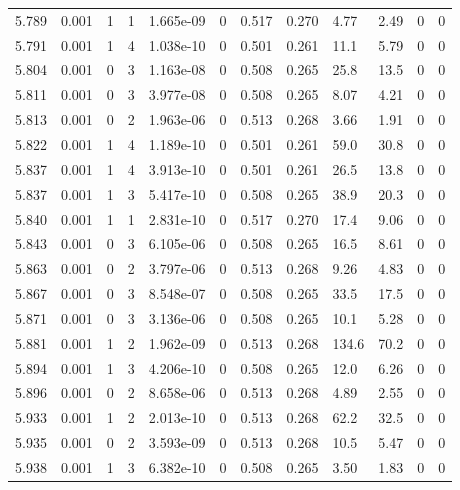 \documentclass[preview]{standalone}
\begin{document}
{{{{{{{{{{{{{{{{\begin{tabular}{L{1.2cm}C{1.2cm} C{0.3cm}C{0.5cm} C{1.4cm}C{1.4cm} C{1.4cm}C{1.4cm} C{1.6cm}C{1.6cm} C{1.6cm}C{1.6cm}}
  5.789  &  0.001  & 1     &  1 &  1.665e-09  & 0  &  0.517&   0.270& 4.77 & 2.49   &  0 & 0  \\ 
  5.791  &  0.001  & 1     &  4 &  1.038e-10  & 0  &  0.501&   0.261& 11.1 & 5.79   &  0 & 0  \\ 
  5.804  &  0.001  & 0     &  3 &  1.163e-08  & 0  &  0.508&   0.265& 25.8 & 13.5   &  0 & 0  \\ 
  5.811  &  0.001  & 0     &  3 &  3.977e-08  & 0  &  0.508&   0.265& 8.07 & 4.21   &  0 & 0  \\ 
  5.813  &  0.001  & 0     &  2 &  1.963e-06  & 0  &  0.513&   0.268& 3.66 & 1.91   &  0 & 0  \\ 
  5.822  &  0.001  & 1     &  4 &  1.189e-10  & 0  &  0.501&   0.261& 59.0 & 30.8   &  0 & 0  \\ 
  5.837  &  0.001  & 1     &  4 &  3.913e-10  & 0  &  0.501&   0.261& 26.5 & 13.8   &  0 & 0  \\ 
  5.837  &  0.001  & 1     &  3 &  5.417e-10  & 0  &  0.508&   0.265& 38.9 & 20.3   &  0 & 0  \\ 
  5.840  &  0.001  & 1     &  1 &  2.831e-10  & 0  &  0.517&   0.270& 17.4 & 9.06   &  0 & 0  \\ 
  5.843  &  0.001  & 0     &  3 &  6.105e-06  & 0  &  0.508&   0.265& 16.5 & 8.61   &  0 & 0  \\ 
  5.863  &  0.001  & 0     &  2 &  3.797e-06  & 0  &  0.513&   0.268& 9.26 & 4.83   &  0 & 0  \\ 
  5.867  &  0.001  & 0     &  3 &  8.548e-07  & 0  &  0.508&   0.265& 33.5 & 17.5   &  0 & 0  \\ 
  5.871  &  0.001  & 0     &  3 &  3.136e-06  & 0  &  0.508&   0.265& 10.1 & 5.28   &  0 & 0  \\ 
  5.881  &  0.001  & 1     &  2 &  1.962e-09  & 0  &  0.513&   0.268& 134.6 & 70.2   &  0 & 0  \\ 
  5.894  &  0.001  & 1     &  3 &  4.206e-10  & 0  &  0.508&   0.265& 12.0 & 6.26   &  0 & 0  \\ 
  5.896  &  0.001  & 0     &  2 &  8.658e-06  & 0  &  0.513&   0.268& 4.89 & 2.55   &  0 & 0  \\ 
  5.933  &  0.001  & 1     &  2 &  2.013e-10  & 0  &  0.513&   0.268& 62.2 & 32.5   &  0 & 0  \\ 
  5.935  &  0.001  & 0     &  2 &  3.593e-09  & 0  &  0.513&   0.268& 10.5 & 5.47   &  0 & 0  \\ 
  5.938  &  0.001  & 1     &  3 &  6.382e-10  & 0  &  0.508&   0.265& 3.50 & 1.83   &  0 & 0  \\ 

\end{tabular}}}}}}}}}}}}}}}}}
\end{document}
